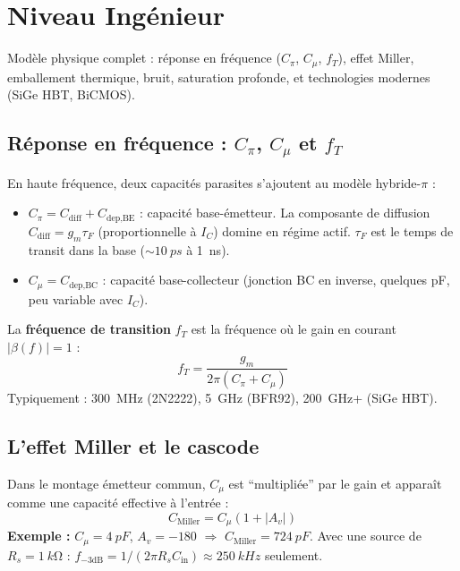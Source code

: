 \documentclass[12pt,a4paper,twoside]{book}
\begin{document}
\section{Niveau Ingénieur}

\begin{ingenieur}
Modèle physique complet : réponse en fréquence ($C_\pi$, $C_\mu$, $f_T$), effet Miller, emballement thermique, bruit, saturation profonde, et technologies modernes (SiGe HBT, BiCMOS).
\end{ingenieur}

\subsection{Réponse en fréquence : $C_\pi$, $C_\mu$ et $f_T$}

En haute fréquence, deux capacités parasites s'ajoutent au modèle hybride-$\pi$ :

\begin{formule}
\begin{itemize}[nosep]
\item $C_\pi = C_{\text{diff}} + C_{\text{dep,BE}}$ : capacité base-émetteur. La composante de diffusion $C_{\text{diff}} = g_m \tau_F$ (proportionnelle à $I_C$) domine en régime actif. $\tau_F$ est le temps de transit dans la base ($\sim\SI{10}{ps}$ à \SI{1}{ns}).
\item $C_\mu = C_{\text{dep,BC}}$ : capacité base-collecteur (jonction BC en inverse, quelques pF, peu variable avec $I_C$).
\end{itemize}

La \textbf{fréquence de transition} $f_T$ est la fréquence où le gain en courant $|\beta(f)| = 1$ :
\[
\boxed{f_T = \frac{g_m}{2\pi(C_\pi + C_\mu)}}
\]
Typiquement : \SI{300}{MHz} (2N2222), \SI{5}{GHz} (BFR92), \SI{200}{GHz}+ (SiGe HBT).
\end{formule}

\subsection{L'effet Miller et le cascode}

\begin{formule}
Dans le montage émetteur commun, $C_\mu$ est ``multipliée'' par le gain et apparaît comme une capacité effective à l'entrée :
\[
\boxed{C_{\text{Miller}} = C_\mu(1 + |A_v|)}
\]
\textbf{Exemple :} $C_\mu = \SI{4}{pF}$, $A_v = -180$ $\Rightarrow$ $C_{\text{Miller}} = \SI{724}{pF}$. Avec une source de $R_s = \SI{1}{k\ohm}$ : $f_{-3\text{dB}} = 1/(2\pi R_s C_{\text{in}}) \approx \SI{250}{kHz}$ seulement.
\end{formule}
\end{document}
